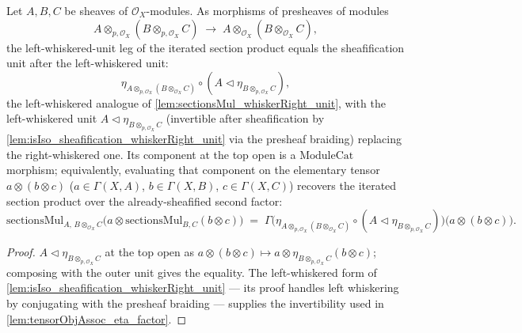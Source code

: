 \begin{lemma}

  \label{lem:sectionsMul_whiskerLeft_unit}
  Let \(A, B, C\) be sheaves of \(\mathcal{O}_X\)-modules. As morphisms of
  presheaves of modules
  \[
    A \otimes_{p,\mathcal{O}_X} (B \otimes_{p,\mathcal{O}_X} C)
      \;\longrightarrow\;
    A \otimes_{\mathcal{O}_X} (B \otimes_{\mathcal{O}_X} C),
  \]
  the left-whiskered-unit leg of the iterated section product equals the
  sheafification unit after the left-whiskered unit:
  \[
    \eta_{A \otimes_{p,\mathcal{O}_X} (B \otimes_{\mathcal{O}_X} C)}
      \circ (A \lhd \eta_{B \otimes_{p,\mathcal{O}_X} C}),
  \]
  the left-whiskered analogue of \cref{lem:sectionsMul_whiskerRight_unit}, with the
  left-whiskered unit \(A \lhd \eta_{B \otimes_{p,\mathcal{O}_X} C}\) (invertible
  after sheafification by \cref{lem:isIso_sheafification_whiskerRight_unit} via the
  presheaf braiding) replacing the right-whiskered one. Its component at the
  top open is a \(\mathrm{ModuleCat}\) morphism; equivalently, evaluating that
  component on the elementary tensor \(a \otimes (b \otimes c)\)
  (\(a \in \Gamma(X,A)\), \(b \in \Gamma(X,B)\), \(c \in \Gamma(X,C)\)) recovers the
  iterated section product over the already-sheafified second factor:
  \[
    \mathrm{sectionsMul}_{A,\, B \otimes_{\mathcal{O}_X} C}\bigl(
      a \otimes \mathrm{sectionsMul}_{B,C}(b \otimes c)\bigr)
    \;=\;
    \Gamma\bigl(
      \eta_{A \otimes_{p,\mathcal{O}_X} (B \otimes_{\mathcal{O}_X} C)}
        \circ (A \lhd \eta_{B \otimes_{p,\mathcal{O}_X} C})
    \bigr)\bigl(a \otimes (b \otimes c)\bigr).
  \]
\end{lemma}

\begin{proof}
  \leanok
  \(A \lhd \eta_{B \otimes_{p,\mathcal{O}_X} C}\) at the top open as
  \(a \otimes (b \otimes c) \mapsto a \otimes \eta_{B \otimes_{p,\mathcal{O}_X} C}(b \otimes c)\);
  composing with the outer unit gives the equality. The left-whiskered form of
  \cref{lem:isIso_sheafification_whiskerRight_unit} --- its proof handles left
  whiskering by conjugating with the presheaf braiding --- supplies the
  invertibility used in \cref{lem:tensorObjAssoc_eta_factor}.
\end{proof}

